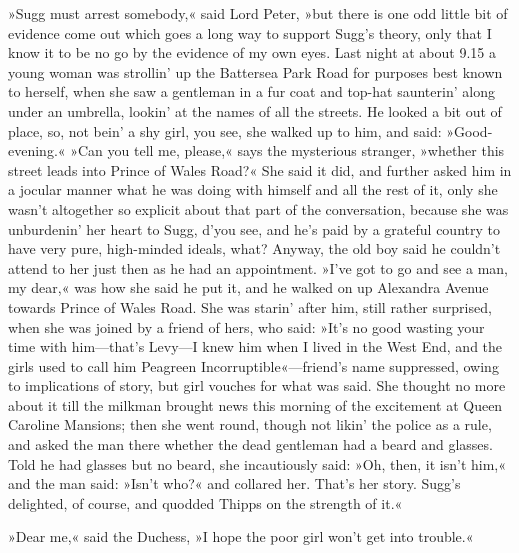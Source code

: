»Sugg must arrest somebody,« said Lord Peter, »but there is one odd little bit of evidence come out which goes a long way to support Sugg's theory, only that I know it to be no go by the evidence of my own eyes. Last night at about 9.15 a young woman was strollin' up the Battersea Park Road for purposes best known to herself, when she saw a gentleman in a fur coat and top-hat saunterin' along under an umbrella, lookin' at the names of all the streets. He looked a bit out of place, so, not bein' a shy girl, you see, she walked up to him, and said: »Good-evening.« »Can you tell me, please,« says the mysterious stranger, »whether this street leads into Prince of Wales Road?« She said it did, and further asked him in a jocular manner what he was doing with himself and all the rest of it, only she wasn't altogether so explicit about that part of the conversation, because she was unburdenin' her heart to Sugg, d'you see, and he's paid by a grateful country to have very pure, high-minded ideals, what? Anyway, the old boy said he couldn't attend to her just then as he had an appointment. »I've got to go and see a man, my dear,« was how she said he put it, and he walked on up Alexandra Avenue towards Prince of Wales Road. She was starin' after him, still rather surprised, when she was joined by a friend of hers, who said: »It's no good wasting your time with him—that's Levy—I knew him when I lived in the West End, and the girls used to call him Peagreen Incorruptible«---friend's name suppressed, owing to implications of story, but girl vouches for what was said. She thought no more about it till the milkman brought news this morning of the excitement at Queen Caroline Mansions; then she went round, though not likin' the police as a rule, and asked the man there whether the dead gentleman had a beard and glasses. Told he had glasses but no beard, she incautiously said: »Oh, then, it isn't him,« and the man said: »Isn't who?« and collared her. That's her story. Sugg's delighted, of course, and quodded Thipps on the strength of it.«

»Dear me,« said the Duchess, »I hope the poor girl won't get into trouble.«

